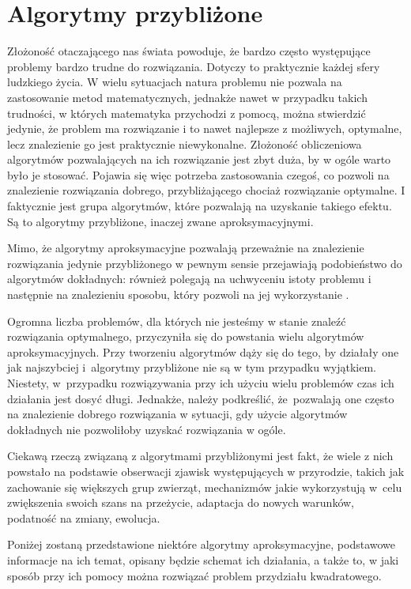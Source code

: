 \chapter{Algorytmy przybliżone}
\label{cha:algorytmy}

Złożoność otaczającego nas świata powoduje, że bardzo często występujące problemy bardzo trudne do rozwiązania. Dotyczy to praktycznie każdej sfery ludzkiego życia. W wielu sytuacjach natura problemu nie pozwala na zastosowanie metod matematycznych, jednakże nawet w przypadku takich trudności, w których matematyka przychodzi z pomocą, można stwierdzić jedynie, że problem ma rozwiązanie i to nawet najlepsze z możliwych, optymalne, lecz znalezienie go jest praktycznie niewykonalne. Złożoność obliczeniowa algorytmów pozwalających na ich  rozwiązanie jest zbyt duża, by w ogóle warto było je stosować. Pojawia się więc potrzeba zastosowania czegoś, co pozwoli na znalezienie rozwiązania dobrego, przybliżającego chociaż rozwiązanie optymalne. I faktycznie jest grupa algorytmów, które pozwalają na uzyskanie takiego efektu. Są to algorytmy przybliżone, inaczej zwane aproksymacyjnymi.

Mimo, że algorytmy aproksymacyjne pozwalają przeważnie na znalezienie rozwiązania jedynie przybliżonego w pewnym sensie przejawiają podobieństwo do algorytmów dokładnych: również polegają na uchwyceniu istoty problemu i następnie na znalezieniu sposobu, który pozwoli na jej  wykorzystanie \cite{APROX}.

Ogromna liczba problemów, dla których nie jesteśmy w stanie znaleźć rozwiązania optymalnego, przyczyniła się do powstania wielu algorytmów aproksymacyjnych.  Przy tworzeniu algorytmów dąży się do tego, by działały one jak najszybciej i~algorytmy przybliżone nie są w tym przypadku wyjątkiem. Niestety, w~przypadku rozwiązywania przy ich użyciu wielu problemów czas ich działania jest dosyć długi. Jednakże, należy podkreślić, że~pozwalają one często na znalezienie dobrego rozwiązania w sytuacji, gdy użycie algorytmów dokładnych nie pozwoliłoby uzyskać rozwiązania w ogóle.

Ciekawą rzeczą związaną z algorytmami przybliżonymi jest fakt, że wiele z nich powstało na podstawie obserwacji zjawisk występujących w przyrodzie, takich jak zachowanie się większych grup zwierząt, mechanizmów jakie wykorzystują w~celu zwiększenia swoich szans na przeżycie, adaptacja do nowych warunków, podatność na zmiany, ewolucja.

Poniżej zostaną przedstawione niektóre algorytmy aproksymacyjne, podstawowe informacje na ich temat, opisany będzie schemat ich działania, a także to, w jaki sposób przy ich pomocy można rozwiązać problem przydziału kwadratowego.


